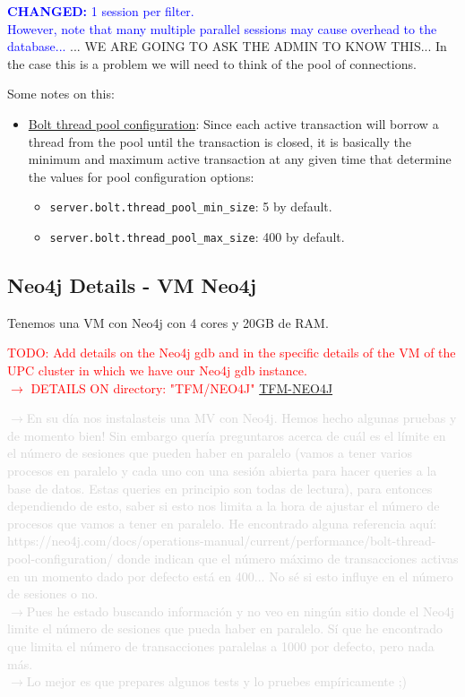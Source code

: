 \textcolor{blue}{\textbf{CHANGED:} 1 session per filter.\\
However, note that many multiple parallel sessions may cause overhead to the database...}
... WE ARE GOING TO ASK THE ADMIN TO KNOW THIS... In the case this is a problem we will need
to think of the pool of connections.


Some notes on this:

\begin{itemize}
  \item \href{https://neo4j.com/docs/operations-manual/current/performance/bolt-thread-pool-configuration/}{Bolt thread pool configuration}: Since each active transaction will borrow a thread from the pool until the transaction is closed, it is basically the minimum and maximum active transaction at any given time that determine the values for pool configuration options: 
  \begin{itemize}
    \item \texttt{server.bolt.thread\_pool\_min\_size}: 5 by default.
    \item \texttt{server.bolt.thread\_pool\_max\_size}: 400 by default.
  \end{itemize}
\end{itemize}

\subsection{Neo4j Details - VM Neo4j}

Tenemos una VM con Neo4j con 4 cores y 20GB de RAM.

\textcolor{red}{TODO: Add details on the Neo4j gdb and in the specific details of the VM of the UPC cluster in which we have our Neo4j gdb instance. \\
$\rightarrow$ DETAILS ON directory: "TFM/NEO4J" \href{https://github.com/FCanfran/TFM-Neo4j}{TFM-NEO4J}}

\textcolor{lightgray}{
$\rightarrow$En su día nos instalasteis una MV con Neo4j. Hemos hecho algunas pruebas y de momento bien!
Sin embargo quería preguntaros acerca de cuál es el límite en el número de sesiones que pueden haber en paralelo  (vamos a tener varios procesos en paralelo y cada uno con una sesión abierta para hacer queries a la base de datos. Estas queries en principio son todas de lectura), para entonces dependiendo de esto, saber si esto nos limita a la hora de ajustar el número de procesos que vamos a tener en paralelo.
He encontrado alguna referencia aquí:
https://neo4j.com/docs/operations-manual/current/performance/bolt-thread-pool-configuration/
donde indican que el número máximo de transacciones activas en un momento dado por defecto está en 400... No sé si esto influye en el número de sesiones o no.\\ $\rightarrow$Pues he estado buscando información y no veo en ningún sitio donde el Neo4j limite el número de sesiones que pueda haber en paralelo. Sí que he encontrado que limita el número de transacciones paralelas a 1000 por defecto, pero nada más.\\ $\rightarrow$Lo mejor es que prepares algunos tests y lo pruebes empíricamente ;)
}


\newpage

